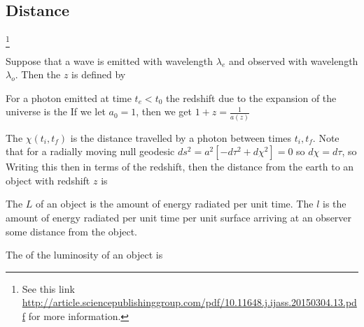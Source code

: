 \documentclass{article}
\begin{document}
\subsection{Distance}\footnote{See this link \href{http://article.sciencepublishinggroup.com/pdf/10.11648.j.ijass.20150304.13.pdf}{http://article.sciencepublishinggroup.com/pdf/10.11648.j.ijass.20150304.13.pdf} for more information. }

\begin{definition}[Redshift]
Suppose that a wave is emitted with wavelength $\lambda_e$ and observed with wavelength $ \lambda_o$. Then the  $z$ is defined by 
\end{definition}

\begin{definition}
For a photon emitted at time $t_e < t_0$ the redshift due to the expansion of the universe is the 
If we let $a_0=1$, then we get $1+z = \frac{1}{a(z)}$
\end{definition}

\begin{definition}
The  $\chi(t_i,t_f)$ is the distance travelled by a photon between times $t_i,t_f$. Note that for a radially moving null geodesic $ds^2 = a^2[-d\tau^2 + d\chi^2] = 0$ so $d\chi=d\tau$, so 
Writing this then in terms of the redshift, then the distance from the earth to an object with redshift $z$ is   
\end{definition}

\begin{definition}[Luminosity]
The  $L$ of an object is the amount of energy radiated per unit time. The  $l$ is the amount of energy radiated per unit time per unit surface arriving at an observer some distance from the object.
\end{definition}

\begin{definition}[Magnitude]
The  of the luminosity of an object is 
\end{definition}
\end{document}
